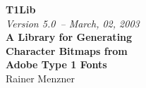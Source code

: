 \documentclass[11pt,a4paper]{article}
\def\libversion{5.0}\relax
\def\libdate{March, 02, 2003}\relax
\begin{document}
\thispagestyle{empty}
\begin{center}
\leavevmode
\vskip2cm
{\Huge\bfseries T1Lib}\\[5mm]

{\Large\sl Version \libversion\ --  \libdate}\\[2.5cm]

{\LARGE\bf A Library for Generating}\\[5mm]
{\LARGE\bf Character Bitmaps from}\\[5mm]
{\LARGE\bf Adobe Type 1 Fonts}\\[2cm]
{\Large\sc Rainer Menzner}\\[2mm]
\end{center}
\newpage
\tableofcontents







\def\indexname{Function Index\addcontentsline{toc}{section}{\hskip1emFunction Index}}%
\printindex
\end{document}
